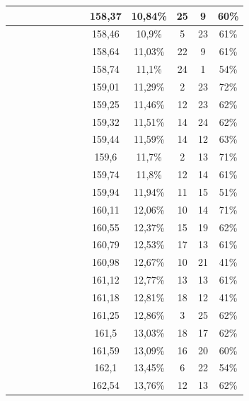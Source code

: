 \begin{center}
\begin{longtable}{|c|c|c|c|c|c|c|c|c|c|c|c|c|}
 \x &  &  &  \x &  \x &  &  &  \x & 158,37 & 10,84\% & 25 & 9 & 60\% \\ \hline
 \x &  \x &  &  &  \x &  &  \x &  \x & 158,46 & 10,9\% & 5 & 23 & 61\% \\ \hline
 \x &  \x &  &  \x &  \x &  &  &  \x & 158,64 & 11,03\% & 22 & 9 & 61\% \\ \hline
 \x &  \x &  &  &  &  &  \x &  \x & 158,74 & 11,1\% & 24 & 1 & 54\% \\ \hline
 \x &  \x &  &  &  \x &  \x &  \x &  \x & 159,01 & 11,29\% & 2 & 23 & 72\% \\ \hline
 \x &  &  \x &  &  \x &  &  \x &  \x & 159,25 & 11,46\% & 12 & 23 & 62\% \\ \hline
 \x &  \x &  \x &  \x &  \x &  &  \x &  \x & 159,32 & 11,51\% & 14 & 24 & 62\% \\ \hline
 \x &  \x &  \x &  &  \x &  &  \x &  \x & 159,44 & 11,59\% & 14 & 12 & 63\% \\ \hline
 \x &  &  \x &  &  &  \x &  \x &  \x & 159,6 & 11,7\% & 2 & 13 & 71\% \\ \hline
 \x &  \x &  \x &  &  \x &  &  &  \x & 159,74 & 11,8\% & 12 & 14 & 61\% \\ \hline
 \x &  &  &  \x &  &  &  \x &  \x & 159,94 & 11,94\% & 11 & 15 & 51\% \\ \hline
 \x &  \x &  &  \x &  &  \x &  \x &  \x & 160,11 & 12,06\% & 10 & 14 & 71\% \\ \hline
 \x &  \x &  \x &  \x &  \x &  &  &  \x & 160,55 & 12,37\% & 15 & 19 & 62\% \\ \hline
 \x &  &  &  &  \x &  &  \x &  \x & 160,79 & 12,53\% & 17 & 13 & 61\% \\ \hline
 \x &  &  &  &  &  &  \x &  \x & 160,98 & 12,67\% & 10 & 21 & 41\% \\ \hline
 \x &  \x &  &  \x &  \x &  &  \x &  \x & 161,12 & 12,77\% & 13 & 13 & 61\% \\ \hline
 \x &  &  &  &  &  &  \x &  \x & 161,18 & 12,81\% & 18 & 12 & 41\% \\ \hline
 \x &  &  \x &  &  &  &  \x &  \x & 161,25 & 12,86\% & 3 & 25 & 62\% \\ \hline
 \x &  &  \x &  \x &  \x &  &  &  \x & 161,5 & 13,03\% & 18 & 17 & 62\% \\ \hline
 \x &  &  &  &  \x &  &  \x &  \x & 161,59 & 13,09\% & 16 & 20 & 60\% \\ \hline
 \x &  \x &  &  \x &  &  &  \x &  \x & 162,1 & 13,45\% & 6 & 22 & 54\% \\ \hline
 \x &  &  \x &  &  \x &  &  \x &  \x & 162,54 & 13,76\% & 12 & 13 & 62\% \\ \hline

\end{longtable}
\end{center}
